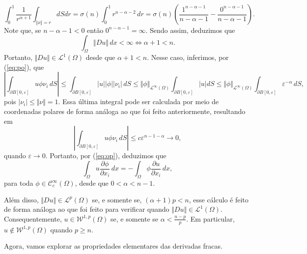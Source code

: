 \documentclass[a4paper, 11pt]{book}
\theoremstyle{definition}
\newcommand{\cC}{\mathcal{C}}
\newcommand{\cL}{\mathcal{L}}
\newcommand{\cW}{\mathcal{W}}
\begin{document}
\begin{ex}
    \[
        \int_0^1 \frac{1}{r^{\alpha+1}}  \int_{\Vert x \Vert = r} dS dr = \sigma(n)\int_0^1 r^{n-\alpha-2} \,dr = \sigma(n)\left(\frac{1^{n-\alpha-1}}{n-\alpha -1} - \frac{0^{n-\alpha-1}}{n-\alpha-1}\right).
    \]
    Note que, se $n - \alpha - 1 < 0$ então $0^{n-\alpha-1} = \infty$. Sendo assim, deduzimos que
    \[
        \int_\Omega \Vert Du \Vert \, dx < \infty \iff \alpha + 1 < n.
    \]
    Portanto, $\Vert Du \Vert \in \cL^1(\Omega)$ desde que $\alpha + 1 < n$.
    Nesse caso, inferimos, por (\ref{eq:po}), que
    \[
        \left| \int_{\partial B[0,\varepsilon]} u \phi \nu_i \,dS \right| \leqslant 
        \int_{\partial B[0,\varepsilon]} |u| |\phi| |\nu_i| \,dS \leqslant \Vert \phi \Vert_{\cL^\infty(\Omega)}\int_{\partial B[0,\varepsilon]} |u|dS \leqslant \Vert \phi \Vert_{\cL^\infty(\Omega)}\int_{\partial B[0,\varepsilon]} \varepsilon^{-\alpha} \,dS,
    \]
    pois $|\nu_i| \leqslant \Vert \nu \Vert = 1$. Essa última integral pode ser calculada por meio de coordenadas polares de forma análoga ao que foi feito anteriormente, resultando em
    \[
        \left| \int_{\partial B[0,\varepsilon]} u \phi \nu_i \,dS \right| \leqslant c \varepsilon^{n-1-\alpha} \to 0,
    \]
    quando $\varepsilon \to 0$. Portanto, por (\ref{eq:op}), deduzimos que
    \[
        \int_{\Omega} u \dfrac{\partial \phi}{\partial x_i} \, dx = -\int_{\Omega} \phi \dfrac{\partial u}{\partial x_i} \,dx,
    \]
    para toda $\phi \in \cC^\infty_c(\Omega)$, desde que $0 < \alpha < n-1$. 

    Além disso, $\Vert Du \Vert \in \cL^p(\Omega)$ se, e somente se, $(\alpha + 1)p < n$, esse cálculo é feito de forma análoga ao que foi feito para verificar quando $\Vert Du \Vert \in \cL^1(\Omega)$. Consequentemente, $u \in \cW^{1,p}(\Omega)$ se, e somente se $\alpha < \frac{n-p}{p}$.
    Em particular, $u \not\in \cW^{1,p}(\Omega)$ quando $p \geqslant n$.
\end{ex}

Agora, vamos explorar as propriedades elementares das derivadas fracas.
\end{document}
